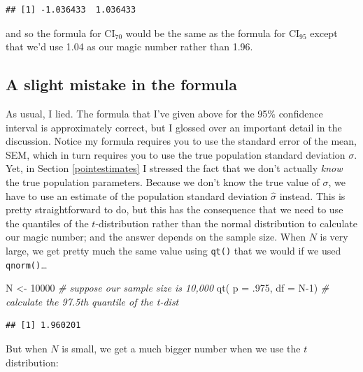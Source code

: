 \documentclass[
]{book}
\newenvironment{Shaded}{\begin{snugshade}}{\end{snugshade}}
\newcommand{\AttributeTok}[1]{\textcolor[rgb]{0.77,0.63,0.00}{#1}}
\newcommand{\CommentTok}[1]{\textcolor[rgb]{0.56,0.35,0.01}{\textit{#1}}}
\newcommand{\DecValTok}[1]{\textcolor[rgb]{0.00,0.00,0.81}{#1}}
\newcommand{\FunctionTok}[1]{\textcolor[rgb]{0.00,0.00,0.00}{#1}}
\newcommand{\NormalTok}[1]{#1}
\newcommand{\OtherTok}[1]{\textcolor[rgb]{0.56,0.35,0.01}{#1}}
\begin{document}
\begin{verbatim}
## [1] -1.036433  1.036433
\end{verbatim}

and so the formula for \(\mbox{CI}_{70}\) would be the same as the formula for \(\mbox{CI}_{95}\) except that we'd use 1.04 as our magic number rather than 1.96.

\hypertarget{a-slight-mistake-in-the-formula}{%
\subsection{A slight mistake in the formula}\label{a-slight-mistake-in-the-formula}}

As usual, I lied. The formula that I've given above for the 95\% confidence interval is approximately correct, but I glossed over an important detail in the discussion. Notice my formula requires you to use the standard error of the mean, SEM, which in turn requires you to use the true population standard deviation \(\sigma\). Yet, in Section \ref{pointestimates} I stressed the fact that we don't actually \emph{know} the true population parameters. Because we don't know the true value of \(\sigma\), we have to use an estimate of the population standard deviation \(\hat{\sigma}\) instead. This is pretty straightforward to do, but this has the consequence that we need to use the quantiles of the \(t\)-distribution rather than the normal distribution to calculate our magic number; and the answer depends on the sample size. When \(N\) is very large, we get pretty much the same value using \texttt{qt()} that we would if we used \texttt{qnorm()}\ldots{}

\begin{Shaded}
\begin{Highlighting}[]
\NormalTok{N }\OtherTok{\textless{}{-}} \DecValTok{10000}   \CommentTok{\# suppose our sample size is 10,000}
\FunctionTok{qt}\NormalTok{( }\AttributeTok{p =}\NormalTok{ .}\DecValTok{975}\NormalTok{, }\AttributeTok{df =}\NormalTok{ N}\DecValTok{{-}1}\NormalTok{)   }\CommentTok{\# calculate the 97.5th quantile of the t{-}dist}
\end{Highlighting}
\end{Shaded}

\begin{verbatim}
## [1] 1.960201
\end{verbatim}

But when \(N\) is small, we get a much bigger number when we use the \(t\) distribution:
\end{document}
